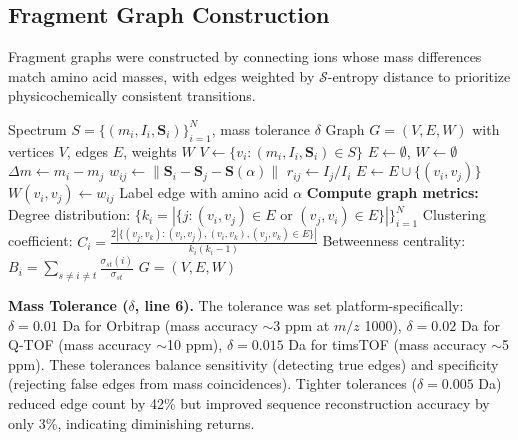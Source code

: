 \documentclass[11pt,twocolumn]{article}
\newcommand{\sentropy}{$\mathcal{S}$-entropy}
\begin{document}
\subsection{Fragment Graph Construction}
\label{sec:intensity_validation}

Fragment graphs were constructed by connecting ions whose mass differences match amino acid masses, with edges weighted by \sentropy{} distance to prioritize physicochemically consistent transitions.

\begin{algorithm}[h]
\caption{Fragment Graph Construction with \sentropy{} Weighting}
\label{alg:graph}
\begin{algorithmic}[1]
\Require Spectrum $S = \{(m_i, I_i, \mathbf{S}_i)\}_{i=1}^N$, mass tolerance $\delta$
\Ensure Graph $G = (V, E, W)$ with vertices $V$, edges $E$, weights $W$
\State $V \gets \{v_i : (m_i, I_i, \mathbf{S}_i) \in S\}$ 
\State $E \gets \emptyset$, $W \gets \emptyset$
 
        \State $\Delta m \gets m_i - m_j$ 
         
            \State $w_{ij} \gets \| \mathbf{S}_i - \mathbf{S}_j - \mathbf{S}(\alpha) \|$ \Comment{\sentropy{} distance (Eq.~\ref{eq:edge_weight})}
             
                \State $r_{ij} \gets I_j / I_i$ 
                 
                    \State $E \gets E \cup \{(v_i, v_j)\}$ 
                    \State $W(v_i, v_j) \gets w_{ij}$ 
                    \State Label edge with amino acid $\alpha$
                \EndIf
            \EndIf
        \EndIf
    \EndFor
\EndFor
\State \textbf{Compute graph metrics:}
\State Degree distribution: $\{k_i = |\{j : (v_i, v_j) \in E \text{ or } (v_j, v_i) \in E\}|\}_{i=1}^N$
\State Clustering coefficient: $C_i = \frac{2|\{(v_j, v_k) : (v_i, v_j), (v_i, v_k), (v_j, v_k) \in E\}|}{k_i(k_i - 1)}$
\State Betweenness centrality: $B_i = \sum_{s \neq i \neq t} \frac{\sigma_{st}(i)}{\sigma_{st}}$ 
\State \Return $G = (V, E, W)$
\end{algorithmic}
\end{algorithm}

\textbf{Mass Tolerance ($\delta$, line 6).} The tolerance was set platform-specifically: $\delta = 0.01$ Da for Orbitrap (mass accuracy $\sim$3 ppm at $m/z$ 1000), $\delta = 0.02$ Da for Q-TOF (mass accuracy $\sim$10 ppm), $\delta = 0.015$ Da for timsTOF (mass accuracy $\sim$5 ppm). These tolerances balance sensitivity (detecting true edges) and specificity (rejecting false edges from mass coincidences). Tighter tolerances ($\delta = 0.005$ Da) reduced edge count by 42\% but improved sequence reconstruction accuracy by only 3\%, indicating diminishing returns.
\end{document}
